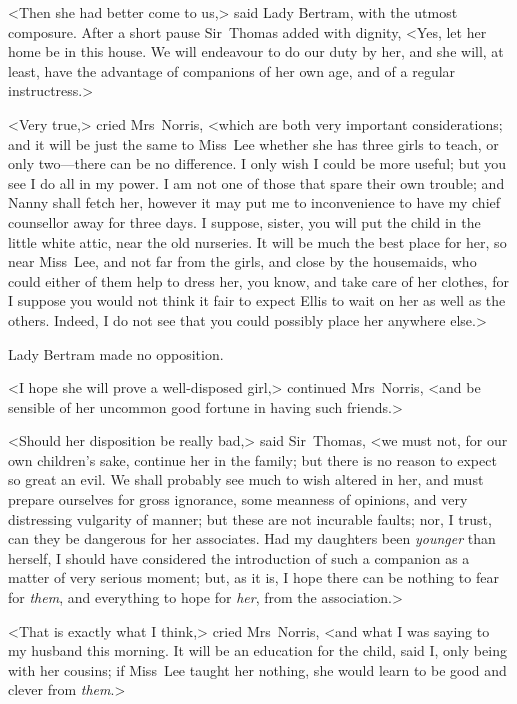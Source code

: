 <Then she had better come to us,> said Lady Bertram, with the utmost composure. After a short pause Sir~Thomas added with dignity, <Yes, let her home be in this house. We will endeavour to do our duty by her, and she will, at least, have the advantage of companions of her own age, and of a regular instructress.>

<Very true,> cried Mrs~Norris, <which are both very important considerations; and it will be just the same to Miss~Lee whether she has three girls to teach, or only two—there can be no difference. I only wish I could be more useful; but you see I do all in my power. I am not one of those that spare their own trouble; and Nanny shall fetch her, however it may put me to inconvenience to have my chief counsellor away for three days. I suppose, sister, you will put the child in the little white attic, near the old nurseries. It will be much the best place for her, so near Miss~Lee, and not far from the girls, and close by the housemaids, who could either of them help to dress her, you know, and take care of her clothes, for I suppose you would not think it fair to expect Ellis to wait on her as well as the others. Indeed, I do not see that you could possibly place her anywhere else.>

Lady Bertram made no opposition.

<I hope she will prove a well-disposed girl,> continued Mrs~Norris, <and be sensible of her uncommon good fortune in having such friends.>

<Should her disposition be really bad,> said Sir~Thomas, <we must not, for our own children's sake, continue her in the family; but there is no reason to expect so great an evil. We shall probably see much to wish altered in her, and must prepare ourselves for gross ignorance, some meanness of opinions, and very distressing vulgarity of manner; but these are not incurable faults; nor, I trust, can they be dangerous for her associates. Had my daughters been \textit{younger}  than herself, I should have considered the introduction of such a companion as a matter of very serious moment; but, as it is, I hope there can be nothing to fear for \textit{them}, and everything to hope for \textit{her}, from the association.>

<That is exactly what I think,> cried Mrs~Norris, <and what I was saying to my husband this morning. It will be an education for the child, said I, only being with her cousins; if Miss~Lee taught her nothing, she would learn to be good and clever from \textit{them}.>

